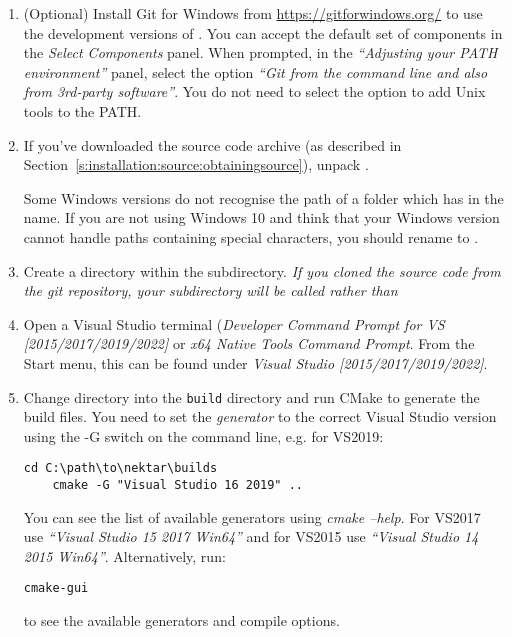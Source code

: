 \begin{enumerate}
\begin{itemize}
  \end{itemize}
  \item (Optional) Install Git for Windows from
  \url{https://gitforwindows.org/} to use the development versions of \nekpp.
  You can accept the default set of components in the \emph{Select Components}
  panel. When prompted, in the \emph{``Adjusting your PATH environment''}
  panel, select the option \emph{``Git from the command line and also from
  3rd-party software''}. You do not need to select the option to add Unix
  tools to the PATH.

  \item If you've downloaded the source code archive (as described in
  Section~\ref{s:installation:source:obtainingsource}), unpack
  .

  \begin{notebox}
    Some Windows versions do not recognise the path of a folder which has
    \inltt{++} in the name. If you are not using Windows 10 and think that your
    Windows version cannot handle paths containing special characters, you
    should rename  to .
  \end{notebox}
  \item Create a  directory within the 
  subdirectory. \textit{If you cloned the source code from the git repository,
  your \nekpp subdirectory will be called  rather than
  }

  \item Open a Visual Studio terminal (\emph{Developer Command Prompt for
  VS [2015/2017/2019/2022]} or \emph{x64 Native Tools Command Prompt}. From the
  Start menu, this can be found under \emph{Visual Studio [2015/2017/2019/2022]}.

  \item Change directory into the \texttt{build} directory and run CMake to
  generate the build files. You need to set the \emph{generator} to the
  correct Visual Studio version using the -G switch on the command line, e.g.
  for VS2019:
  \begin{lstlisting}[style=BashInputStyle]
    cd C:\path\to\nektar\builds
    cmake -G "Visual Studio 16 2019" ..
  \end{lstlisting}
  You can see the list of available generators using \emph{cmake --help}. For
  VS2017 use \emph{``Visual Studio 15 2017 Win64''} and for VS2015 use
  \emph{``Visual Studio 14 2015 Win64''}.  Alternatively, run:
  \begin{lstlisting}[style=BashInputStyle]
    cmake-gui
  \end{lstlisting} 
  to see the available generators and compile options.


\end{enumerate}

